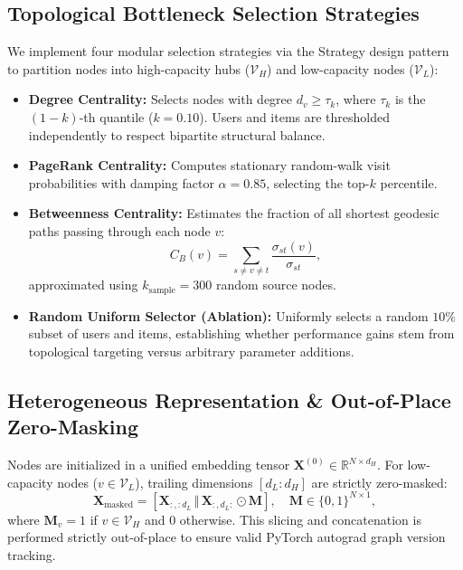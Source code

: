 \documentclass[11pt,a4paper]{article}
\begin{document}
\subsection{Topological Bottleneck Selection Strategies}
We implement four modular selection strategies via the Strategy design pattern to partition nodes into high-capacity hubs ($\mathcal{V}_H$) and low-capacity nodes ($\mathcal{V}_L$):
\begin{itemize}
    \item \textbf{Degree Centrality:} Selects nodes with degree $d_v \ge \tau_k$, where $\tau_k$ is the $(1-k)$-th quantile ($k=0.10$). Users and items are thresholded independently to respect bipartite structural balance.
    \item \textbf{PageRank Centrality:} Computes stationary random-walk visit probabilities with damping factor $\alpha = 0.85$, selecting the top-$k$ percentile.
    \item \textbf{Betweenness Centrality:} Estimates the fraction of all shortest geodesic paths passing through each node $v$:
    \begin{equation}
        C_B(v) = \sum_{s \ne v \ne t} \frac{\sigma_{st}(v)}{\sigma_{st}},
    \end{equation}
    approximated using $k_{\text{sample}} = 300$ random source nodes.
    \item \textbf{Random Uniform Selector (Ablation):} Uniformly selects a random $10\%$ subset of users and items, establishing whether performance gains stem from topological targeting versus arbitrary parameter additions.
\end{itemize}

\subsection{Heterogeneous Representation \& Out-of-Place Zero-Masking}
Nodes are initialized in a unified embedding tensor $\mathbf{X}^{(0)} \in \mathbb{R}^{N \times d_H}$. For low-capacity nodes ($v \in \mathcal{V}_L$), trailing dimensions $[d_L : d_H]$ are strictly zero-masked:
\begin{equation}
    \mathbf{X}_{\text{masked}} = \left[ \mathbf{X}_{:, :d_L} \,\Vert{}\, \mathbf{X}_{:, d_L:} \odot \mathbf{M} \right], \quad \mathbf{M} \in \{0, 1\}^{N \times 1},
\end{equation}
where $\mathbf{M}_v = 1$ if $v \in \mathcal{V}_H$ and $0$ otherwise. This slicing and concatenation is performed strictly out-of-place to ensure valid PyTorch autograd graph version tracking.
\end{document}
